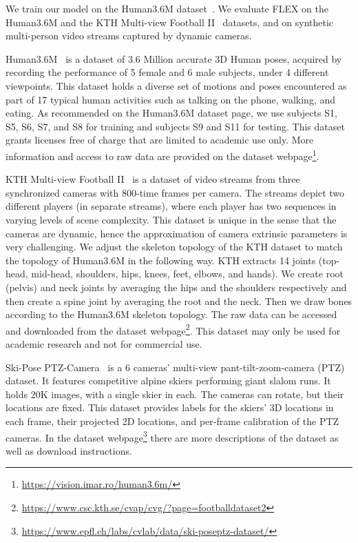   \label{sec:data}
We train our model on the Human3.6M dataset~\cite{h36m_pami,IonescuSminchisescu11}. We evaluate FLEX on the Human3.6M and the KTH Multi-view Football II~\cite{footballDS} datasets, and on synthetic multi-person video streams captured by dynamic cameras.

Human3.6M~\cite{h36m_pami,IonescuSminchisescu11} is a dataset of 3.6 Million accurate 3D Human poses, acquired by recording the performance of 5 female and 6 male subjects, under 4 different viewpoints.
This dataset holds a diverse set of motions and poses encountered as part of 17 typical human activities such as talking on the phone, walking, and eating.
As recommended on the Human3.6M dataset page, we use subjects S1, S5, S6, S7, and S8 for training and subjects S9 and S11 for testing.
This dataset grants licenses free of charge that are limited to academic use only. More information and access to raw data are provided on the dataset webpage\footnote{\url{https://vision.imar.ro/human3.6m/}}.

KTH Multi-view Football II~\cite{footballDS} is a dataset of video streams from three synchronized cameras with 800-time frames per camera. The streams depict two different players (in separate streams), where each player has two sequences in varying levels of scene complexity.
%
This dataset is unique in the sense that the cameras are dynamic, hence the approximation of camera extrinsic parameters is very challenging.
%
We adjust the skeleton topology of the KTH dataset to match the topology of Human3.6M in the following way. KTH extracts 14 joints (top-head, mid-head, shoulders, hips, knees, feet, elbows, and hands). We create root (pelvis) and neck joints by averaging the hips and the shoulders respectively and then create a spine joint by averaging the root and the neck. Then we draw bones according to the Human3.6M skeleton topology.
The raw data can be accessed and downloaded from the dataset webpage\footnote{\url{https://www.csc.kth.se/cvap/cvg/?page=footballdataset2}}. This dataset may only be used for academic research and not for commercial use.

Ski-Pose PTZ-Camera~\cite{ski_ptz} is a 6 cameras' multi-view pant-tilt-zoom-camera (PTZ) dataset. It features competitive alpine skiers performing giant slalom runs.
It holds 20K images, with a single skier in each. 
The cameras can rotate, but their locations are fixed.
This dataset provides labels for the skiers’ 3D locations in each frame, their projected 2D locations, and per-frame calibration of the PTZ cameras.
In the dataset webpage\footnote{\url{https://www.epfl.ch/labs/cvlab/data/ski-poseptz-dataset/}} there are more descriptions of the dataset as well as download instructions.

